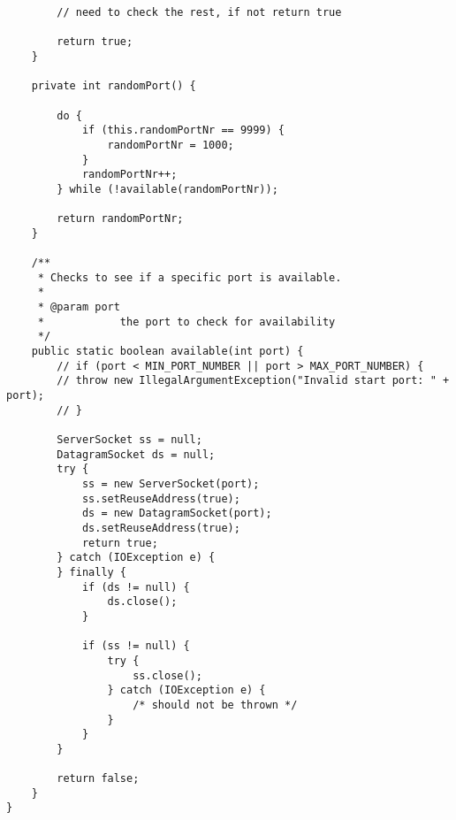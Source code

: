 \begin{lstlisting}
		// need to check the rest, if not return true
	
		return true;
	}

	private int randomPort() {

		do {
			if (this.randomPortNr == 9999) {
				randomPortNr = 1000;
			}
			randomPortNr++;
		} while (!available(randomPortNr));

		return randomPortNr;
	}

	/**
	 * Checks to see if a specific port is available.
	 * 
	 * @param port
	 *            the port to check for availability
	 */
	public static boolean available(int port) {
		// if (port < MIN_PORT_NUMBER || port > MAX_PORT_NUMBER) {
		// throw new IllegalArgumentException("Invalid start port: " + port);
		// }

		ServerSocket ss = null;
		DatagramSocket ds = null;
		try {
			ss = new ServerSocket(port);
			ss.setReuseAddress(true);
			ds = new DatagramSocket(port);
			ds.setReuseAddress(true);
			return true;
		} catch (IOException e) {
		} finally {
			if (ds != null) {
				ds.close();
			}

			if (ss != null) {
				try {
					ss.close();
				} catch (IOException e) {
					/* should not be thrown */
				}
			}
		}

		return false;
	}
}

\end{lstlisting}